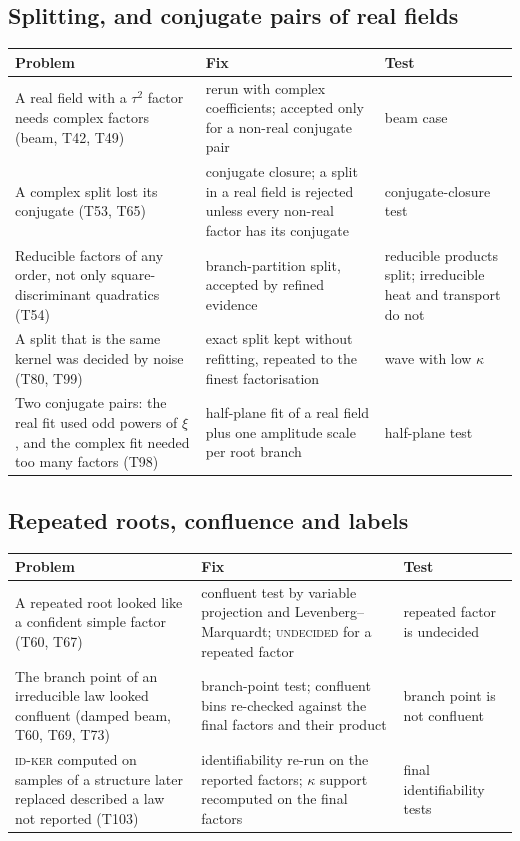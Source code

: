 \subsection{Splitting, and conjugate pairs of real fields}
\begin{center}\small
\begin{tabular}{@{}L{4.1cm}L{4.4cm}L{4.4cm}@{}}
\toprule
Problem & Fix & Test\\\midrule
A real field with a $\tau^2$ factor needs complex factors (beam, T42, T49) & rerun with complex coefficients; accepted only for a non-real conjugate pair & beam case\\
A complex split lost its conjugate (T53, T65) & conjugate closure; a split in a real field is rejected unless every non-real factor has its conjugate & conjugate-closure test\\
Reducible factors of any order, not only square-discriminant quadratics (T54) & branch-partition split, accepted by refined evidence & reducible products split; irreducible heat and transport do not\\
A split that is the same kernel was decided by noise (T80, T99) & exact split kept without refitting, repeated to the finest factorisation & wave with low $\kappa$\\
Two conjugate pairs: the real fit used odd powers of $\xi$, and the complex fit needed too many factors (T98) & half-plane fit of a real field plus one amplitude scale per root branch & half-plane test\\
\bottomrule
\end{tabular}
\end{center}

\subsection{Repeated roots, confluence and labels}
\begin{center}\small
\begin{tabular}{@{}L{4.1cm}L{4.4cm}L{4.4cm}@{}}
\toprule
Problem & Fix & Test\\\midrule
A repeated root looked like a confident simple factor (T60, T67) & confluent test by variable projection and Levenberg--Marquardt; \textsc{undecided} for a repeated factor & repeated factor is undecided\\
The branch point of an irreducible law looked confluent (damped beam, T60, T69, T73) & branch-point test; confluent bins re-checked against the final factors and their product & branch point is not confluent\\
\textsc{id-ker} computed on samples of a structure later replaced described a law not reported (T103) & identifiability re-run on the reported factors; $\kappa$ support recomputed on the final factors & final identifiability tests\\
\bottomrule
\end{tabular}
\end{center}

